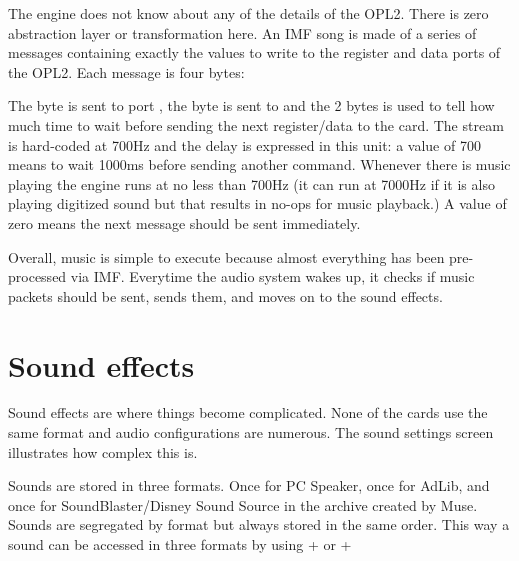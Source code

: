 \par
The engine does not know about any of the details of the OPL2. There is zero abstraction layer or transformation here. An IMF song is made of a series of messages containing exactly the values to write to the register and data ports of the OPL2. Each message is four bytes:\\
\par
\begin{minipage}{\textwidth}

\end{minipage}
\par
The  byte is sent to port , the  byte is sent to  and the  2 bytes is used to tell how much time to wait before sending the next register/data to the card. The stream is hard-coded at 700Hz and the delay is expressed in this unit: a value of 700 means to wait 1000ms before sending another command. Whenever there is music playing the engine runs at no less than 700Hz (it can run at 7000Hz if it is also playing digitized sound but that results in no-ops for music playback.) A value of zero means the next message should be sent immediately.\\
\par
Overall, music is simple to execute because almost everything has been pre-processed via IMF. Everytime the audio system wakes up, it checks if music packets should be sent, sends them, and moves on to the sound effects.










\section{Sound effects}
Sound effects are where things become complicated. None of the cards use the same format and audio configurations are numerous. The sound settings screen illustrates how complex this is.
\par
\begin{figure}[H]
\centering
 \end{figure}
\par
Sounds are stored in three formats. Once for PC Speaker, once for AdLib, and once for SoundBlaster/Disney Sound Source in the  archive created by Muse. Sounds are segregated by format but always stored in the same order. This way a sound can be accessed in three formats by using  +  or  + \\

